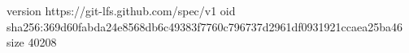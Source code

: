 version https://git-lfs.github.com/spec/v1
oid sha256:369d60fabda24e8568db6c49383f7760c796737d2961df0931921ccaea25ba46
size 40208
